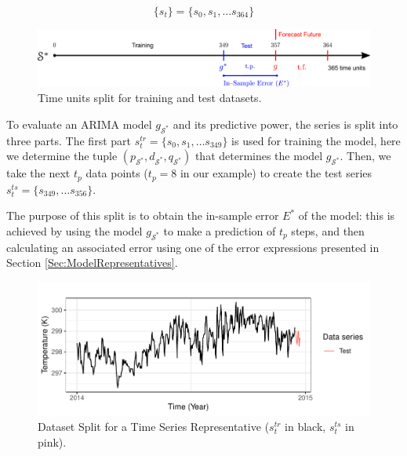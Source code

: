 \begin{equation}
    \{s_{t} \} = \{s_{0}, s_{1}, \ldots s_{364} \}
\end{equation}

\begin{figure}[h!]
	\centering
	\includegraphics[scale=0.38]{../Figures/ModelRegion_ModelTS}
	\caption{Time units split for training and test datasets.}
	\label{Fig:TimeSplit}
\end{figure}

To evaluate an ARIMA model $g_{\mathcal{S}^{*}}$ and its predictive power, the series is split into three parts. The first part $s^{tr}_t = \lbrace s_0, s_1, \ldots s_{349} \rbrace$ is used for training the model, %
here we determine the tuple $(p_{\mathcal{S}^{*}}, d_{\mathcal{S}^{*}}, q_{\mathcal{S}^{*}})$ that determines the model $g_{\mathcal{S}^{*}}$. Then, we take the next $t_p$ data points ($t_p = 8$ in our example) to create the test series $s^{ts}_t = \lbrace s_{349}, \ldots s_{356} \rbrace$.

The purpose of this split is to obtain the in-sample error ${E^*}$ of the model: this is achieved by using the model $g_{\mathcal{S}^{*}}$ to make a prediction of $t_p$ steps, and then calculating an associated error using one of the error expressions presented in Section \ref{Sec:ModelRepresentatives}. 

\begin{figure}[h!]
	\centering
	\includegraphics[scale=1]{../Figures/medoid_test_training}
	\caption{Dataset Split for a Time Series Representative ($s^{tr}_t$ in black, $s^{ts}_t$ in pink).}
	\label{Fig:Time-SeriesSplit}
\end{figure}

